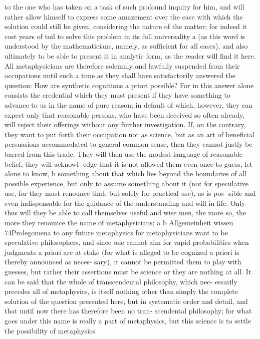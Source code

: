to the one who has taken on a task of such profound inquiry for him,
and will rather allow himself to express some amazement over the ease
with which the solution could still be given, considering the nature of
the matter; for indeed it cost years of toil to solve this problem in its full
universality a (as this word is understood by the mathematicians, namely,
as sufﬁcient for all cases), and also ultimately to be able to present it in
analytic form, as the reader will ﬁnd it here.
All metaphysicians are therefore solemnly and lawfully suspended
from their occupations until such a time as they shall have satisfactorily
answered the question: How are synthetic cognitions a priori possible? For in
this answer alone consists the credential which they must present if they
have something to advance to us in the name of pure reason; in default
of which, however, they can expect only that reasonable persons, who
have been deceived so often already, will reject their offerings without
any further investigation.
If, on the contrary, they want to put forth their occupation not as
science, but as an art of beneﬁcial persuasions accommodated to general
common sense, then they cannot justly be barred from this trade. They
will then use the modest language of reasonable belief, they will acknowl-
edge that it is not allowed them even once to guess, let alone to know, b
something about that which lies beyond the boundaries of all possible
experience, but only to assume something about it (not for speculative
use, for they must renounce that, but solely for practical use), as is pos-
sible and even indispensable for the guidance of the understanding and
will in life. Only thus will they be able to call themselves useful and wise
men, the more so, the more they renounce the name of metaphysicians;
a
b
Allgemeinheit
wissen
74Prolegomena to any future metaphysics
for metaphysicians want to be speculative philosophers, and since one
cannot aim for vapid probabilities when judgments a priori are at stake
(for what is alleged to be cognized a priori is thereby announced as neces-
sary), it cannot be permitted them to play with guesses, but rather their
assertions must be science or they are nothing at all.
It can be said that the whole of transcendental philosophy, which nec-
essarily precedes all of metaphysics, is itself nothing other than simply
the complete solution of the question presented here, but in systematic
order and detail, and that until now there has therefore been no tran-
scendental philosophy; for what goes under this name is really a part of
metaphysics, but this science is to settle the possibility of metaphysics
